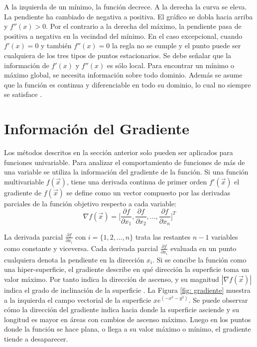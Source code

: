 A la izquierda de un mínimo, la función decrece. A la derecha la curva se eleva. La pendiente ha cambiado de negativa a positiva. El gráfico se dobla hacia arriba y $f''(x)> 0$. Por el contrario a la derecha del máximo, la pendiente pasa de positiva a negativa en la vecindad del mínimo. En el caso excepcional,
cuando $f'(x) = 0$ y también $f''(x) = 0$ la regla no se cumple y el punto puede ser cualquiera de los tres tipos de puntos estacionarios. Se debe señalar que la información de $f'(x)$ y $f''(x)$ es sólo  local. Para encontrar un mínimo o máximo global, se necesita información sobre todo dominio. Además se asume que la función es continua y diferenciable en todo su dominio, lo cual no siempre se satisface \cite{gilbert_calculus_2010}.
\section{Información del Gradiente}
Los métodos descritos en la sección anterior solo pueden ser aplicados para funciones univariable. Para analizar el comportamiento de funciones de más de una variable se utiliza la información del gradiente de la función. Si una función multivariable $f(\vec{x})$, tiene una derivada continua de primer orden $f'(\vec{x})$ el gradiente de $f(\vec{x})$ se define como un vector compuesto por las derivadas parciales de la función objetivo respecto a cada variable:
\begin{equation}
\nabla f(\vec{x})=\bigg[ \frac{\partial f}{\partial x_1}, \frac{\partial f}{\partial x_2},\ldots,\frac{\partial f}{\partial x_n}\bigg]^T
\end{equation}

La derivada parcial  $\frac{\partial f}{\partial x_i}$ con $i=\{1,2,\ldots,n\}$ trata las restantes $n-1$ variables como constante y viceversa. Cada derivada parcial $\frac{\partial f}{\partial x_i}$ evaluada en un punto cualquiera denota la pendiente en la dirección $x_i$. Si se concibe la función como una hiper-superficie, el gradiente describe en qué dirección la superficie toma un valor máximo. Por tanto indica la dirección de ascenso, y su magnitud $|\nabla f(\vec{x})|$ indica el grado de inclinación de la superficie \cite{gilbert_calculus_2010}. La Figura \ref{fig: gradiente} muestra a la izquierda el campo vectorial de la superficie $x e^{(-x^2-y^2)}$. Se puede observar cómo la dirección del gradiente indica hacia donde la superficie asciende y su longitud es mayor en áreas con cambios de ascenso máximo. Luego en los puntos donde la función se hace plana, o llega a su valor máximo o mínimo, el gradiente tiende a desaparecer.  


